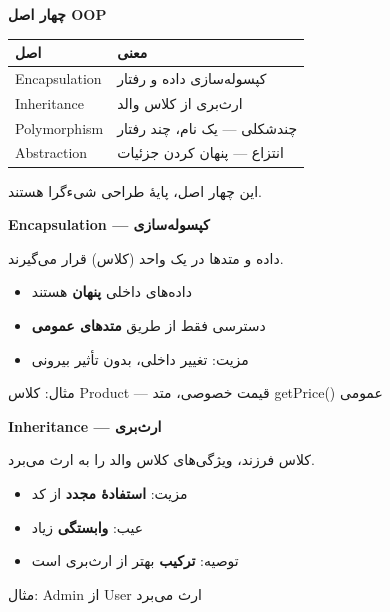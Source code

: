 \documentclass[14pt, a4paper, landscape]{extarticle}
\newcommand{\slide}[1]{%
    \newpage
    \begin{center}
    \begin{minipage}[t]{0.95\textwidth}
    \vspace{0.5cm}
    #1
    \vspace{0.5cm}
    \end{minipage}
    \end{center}
}
\newcommand{\slidetitle}[1]{%
    \begin{center}
        {\LARGE\bfseries\textcolor{primary}{#1}}
    \end{center}
    \vspace{0.5cm}
}
\newcommand{\myaccent}[1]{\textcolor{accent}{#1}}
\begin{document}
\slide{
    \slidetitle{چهار اصل OOP}
    \vspace{0.5cm}
    \begin{center}
        \begin{tabular}{lp{10cm}}
            \toprule
            \textbf{اصل} & \textbf{معنی} \\
            \midrule
            Encapsulation & کپسوله‌سازی داده و رفتار \\
            \hline
            Inheritance & ارث‌بری از کلاس والد \\
            \hline
            Polymorphism & چندشکلی — یک نام، چند رفتار \\
            \hline
            Abstraction & انتزاع — پنهان کردن جزئیات \\
            \bottomrule
        \end{tabular}
    \end{center}
    \vspace{0.8cm}
    \begin{center}
        {\myaccent{این چهار اصل، پایهٔ طراحی شیءگرا هستند.}}
    \end{center}
}

\slide{
    \slidetitle{Encapsulation — کپسوله‌سازی}
    \vspace{0.5cm}
    {\large داده و متدها در یک واحد (کلاس) قرار می‌گیرند.}
    \vspace{0.8cm}
    \begin{itemize}[itemsep=0.5em]
        \item داده‌های داخلی \textbf{پنهان} هستند
        \item دسترسی فقط از طریق \textbf{متدهای عمومی}
        \item مزیت: تغییر داخلی، بدون تأثیر بیرونی
    \end{itemize}
    \vspace{0.8cm}
    \begin{center}
        {\myaccent{مثال: کلاس Product — قیمت خصوصی، متد getPrice() عمومی}}
    \end{center}
}

\slide{
    \slidetitle{Inheritance — ارث‌بری}
    \vspace{0.5cm}
    {\large کلاس فرزند، ویژگی‌های کلاس والد را به ارث می‌برد.}
    \vspace{0.8cm}
    \begin{itemize}[itemsep=0.5em]
        \item مزیت: \textbf{استفادهٔ مجدد} از کد
        \item عیب: \textbf{وابستگی} زیاد
        \item توصیه: \textbf{ترکیب} بهتر از ارث‌بری است
    \end{itemize}
    \vspace{0.8cm}
    \begin{center}
        {\myaccent{مثال: Admin از User ارث می‌برد}}
    \end{center}
}
\end{document}
